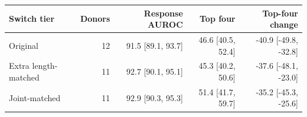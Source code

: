 \begin{tabular}{lrrrr}
\toprule
Switch tier & Donors & Response AUROC & Top four & Top-four change \\
\midrule
Original & 12 & 91.5 [89.1, 93.7] & 46.6 [40.5, 52.4] & -40.9 [-49.8, -32.8] \\
Extra length-matched & 11 & 92.7 [90.1, 95.1] & 45.3 [40.2, 50.6] & -37.6 [-48.1, -23.0] \\
Joint-matched & 11 & 92.9 [90.3, 95.3] & 51.4 [41.7, 59.7] & -35.2 [-45.3, -25.6] \\
\bottomrule
\end{tabular}
